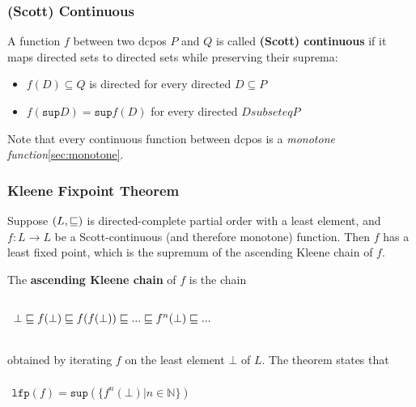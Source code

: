 \subsubsection{(Scott) Continuous}
\label{sec:scott-continuous}

A function $f$ between two dcpos $P$ and $Q$ is called \textbf{(Scott)
  continuous} if it maps directed sets to directed sets while
preserving their suprema:

\begin{itemize}
\item $f(D) \subseteq Q$ is directed for every directed $D \subseteq P$
\item $f(\mathtt{sup}D) = \mathtt{sup} f(D)$ for every directed $D subseteq P$
\end{itemize}

Note that every continuous function between dcpos is a
\textit{monotone function}\ref{sec:monotone}.


\subsubsection{Kleene Fixpoint Theorem}
\label{sec:fixpoint-theorem}

Suppose $(L, \sqsubseteq)$ is directed-complete partial order with a least
element, and $f: L \to L$ be a Scott-continuous (and therefore
monotone) function. Then $f$ has a least fixed point, which is the
supremum of the ascending Kleene chain of $f$.

The \textbf{ascending Kleene chain} of $f$ is the chain

\begin{math}
  \begin{array}{c}
    \\
    \bot \sqsubseteq f(\bot) \sqsubseteq f(f(\bot)) \sqsubseteq ... \sqsubseteq f^n(\bot) \sqsubseteq ...\\
    \\
  \end{array}
\end{math}

obtained by iterating $f$ on the least element $\bot$ of $L$. The
theorem states that

\begin{math}
  \begin{array}{c}
    \\
    \mathtt{lfp}(f) = \mathtt{sup}( \{ f^n(\bot) | n \in \mathbb{N}\})\\
    \\
  \end{array}
\end{math}


